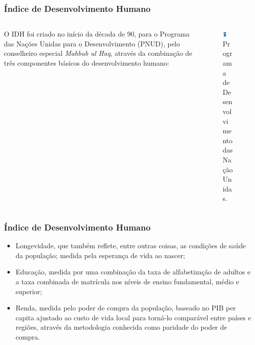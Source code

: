 \documentclass[aspectratio=169]{beamer}
\begin{document}
\begin{frame}
\frametitle{Índice de Desenvolvimento Humano}
\justifying

\begin{columns}

\begin{column}{0.5\textwidth}

O IDH foi criado no início da década de 90, para o Programa das Nações Unidas para o Desenvolvimento (PNUD), pelo conselheiro especial \textit{Mahbub ul Haq}, através da combinação de três componentes básicos do desenvolvimento humano: 

\end{column}

\begin{column}{0.5\textwidth}

\begin{figure}
\centering
\includegraphics[width=0.45\textwidth]{images/pnud.png}
\caption{Programa de Desenvolvimento das Nação Unidas.}
\end{figure}


\end{column}
\end{columns}

\end{frame}

\begin{frame}
\frametitle{Índice de Desenvolvimento Humano}
\justifying

\begin{itemize}
\item Longevidade, que também reflete, entre outras coisas, as condições de saúde da população; medida pela esperança de vida ao nascer;

\item Educação, medida por uma combinação da taxa de alfabetização de adultos e a taxa combinada de matrícula nos níveis de ensino fundamental, médio e superior;

\item Renda, medida pelo poder de compra da população, baseado no PIB per capita ajustado ao custo de vida local para torná-lo comparável entre países e regiões, através da metodologia conhecida como paridade do poder de compra.
\end{itemize}

\end{frame}
\end{document}
